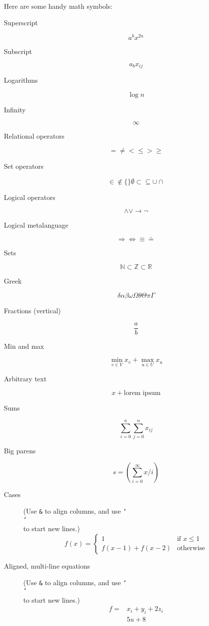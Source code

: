 \documentclass[11pt]{article}
\newcommand{\BACKSLASH}{\char`\\ }
\begin{document}
\begin{enumerate}
Here are some handy math symbols:
\begin{description}
  \item[Superscript]
    \[
      a^b x^{2n}
    \]
  \item[Subscript]
    \[
      a_b x_{ij}
    \]
  \item[Logarithms]
    \[
      \log n
    \]
  \item[Infinity]
    \[
      \infty
    \]
  \item[Relational operators]
    \[
      = \neq < \leq > \geq
    \]
  \item[Set operators]
    \[
      \in \notin \{ \} \emptyset \subset \subseteq \cup \cap
    \]
  \item[Logical operators]
    \[
      \wedge \vee \rightarrow \neg
    \]
  \item[Logical metalanguage]
    \[
      \Rightarrow \Leftrightarrow \equiv \doteq
    \]
  \item[Sets]
    \[
      \mathbb{N} \subset \mathbb{Z} \subset \mathbb{R}
    \]
  \item[Greek]
    \[
      \delta \alpha \beta \omega \Omega \theta \Theta \pi \Gamma
    \]
  \item[Fractions (vertical)]
    \[
      \frac{a}{b}
    \]
  \item[Min and max]
    \[
      \min_{v \in V} x_v + \max_{u \in U} x_u
    \]
  \item[Arbitrary text]
    \[
      x + \text{lorem ipsum}
    \]
  \item[Sums]
    \[
      \sum_{i = 0}^{n} \sum_{j = 0}^{n} x_{ij}
    \]
  \item[Big parens]
    \[
      s = \left( \sum_{i = 0}^{\infty} x/i \right)
    \]
  \item[Cases]
    (Use \texttt{\&} to align columns, and use \texttt{\BACKSLASH \BACKSLASH} to
    start new lines.)
    \[
      f(x) = \begin{cases}
        1                     & \text{if } x \leq 1\\
        f(x - 1) + f(x - 2)   & \text{otherwise}
      \end{cases}
    \]
  \item[Aligned, multi-line equations]
    (Use \texttt{\&} to align columns, and use \texttt{\BACKSLASH \BACKSLASH} to
    start new lines.)
    \[
      \begin{aligned}
        f = & x_i + y_i + 2z_i \\
            & 5u + 8
      \end{aligned}
    \]
\end{description}


\end{enumerate}
\end{document}
